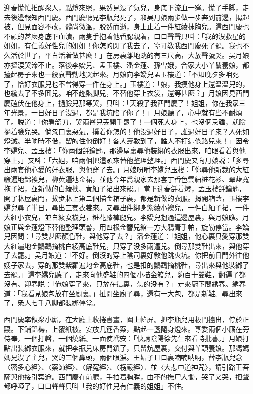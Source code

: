 迎春慌忙推醒衆人，點燈來照，果然見没了氣兒，身底下流血一窪。慌了手脚，走去後邊報知西門慶。西門慶聽見李瓶兒死了，和吴月娘兩步做一步奔到前邊，揭起被，但見面容不改，體尚微溫，脱然而逝，身上止着一件紅綾抹胸兒。這西門慶也不顧的甚麽身底下血漬，兩隻手抱着他香腮親着，口口聲聲只呌：「我的沒救星的姐姐，有仁義好性兒的姐姐！你怎的閃了我去了，寜可敎我西門慶死了罷。我也不久活於世了，平白活着做甚麽！」在房裏離地跳的有三尺高，大放聲號哭。吴月娘亦搵涙哭渧不止。落後李嬌兒、孟玉樓、潘金蓮、孫雪娥，合家大小丫鬟養娘，都擡起房子來也一般哀聲動地哭起來。月娘向李嬌兒孟玉樓道：「不知晚夕多咱死了，恰好衣服兒也不曾得穿一件在身上。」玉樓道：「娘，我摸他身上還溫溫兒的，也纔去了不多囬兒。咱不趂熱脚兒，不替他穿上衣裳，還等甚麽？」月娘因見西門慶磕伏在他身上，撾臉兒那等哭，只呌：「天殺了我西門慶了！姐姐，你在我家三年光景，一日好日子沒過，都是我坑陷了你了！」月娘聽了，心中就有些不耐煩了。説道：「你看韶刀，哭兩聲兒丟開手罷了！一個死人身上，也沒個忌諱，就臉撾着臉兒哭。倘忽口裏惡氣，撲着你怎的！他没過好日子，誰過好日子來？人死如燈滅。半晌時不借，留的住他倒好！各人壽數到了，誰人不打這條路兒來！」因令李嬌兒、孟玉樓：「你兩個㧱鑰匙，那邊屋裏尋他裝綁的衣服出來，咱眼看着與他穿上。」又呌：「六姐，咱兩個把這頭來替他整理整理。」西門慶又向月娘説：「多尋出兩套他心愛的好衣服，與他穿了去。」月娘吩咐李嬌兒玉樓：「你尋他新裁的大紅緞遍地錦襖兒，柳黄遍地金裙，並他今年喬親家去那套丁香色雲紬粧花衫、翠藍寬拖子裙，並新做的白綾襖、黄紬子裙出來罷。」當下迎春㧱着燈，孟玉樓㧱鑰匙，開了牀屋裏門，拔步牀上第二個描金箱子裏，都是新做的衣服。揭開箱蓋，玉樓李嬌兒尋了半日，尋出三套衣裳來。又尋出件綁身紫綾小襖兒，一件白紬子裙，一件大紅小衣兒，並白綾女襪兒，粧花膝褲腿兒。李嬌兒抱過這邊屋裏，與月娘瞧。月娘正與金蓮燈下替他整理頭髻，用四根金簪兒綰一方大鴉青手帕，旋勒停當。李嬌兒因問：「尋雙甚麽顏色鞋，與他穿了去？」潘金蓮道：「姐姐，他心裏只愛穿那雙大紅遍地金鸚鵡摘桃白綾高底鞋兒，只穿了没多兩遭兒。倒尋那雙鞋出來，與他穿了去罷。」吴月娘道：「不好。倒沒的穿上陰司裏好敎他跳火坑。你把前日門外往他嫂子家去，穿的那雙紫羅遍地金高底鞋，也是扣的鸚鵡摘桃鞋，尋出來與他裝綁了去罷。」這李嬌兒聽了，走來向他盛鞋的四個小描金箱兒，約百十雙鞋，翻遍了都沒有。迎春説：「俺娘穿了來，只放在這裏，怎的没有？」走來廚下問綉春。綉春道：「我看見娘包放在坐廚裏。」扯開坐廚子尋，還有一大包，都是新鞋。尋出來了，衆人七手八脚都裝綁停當。

西門慶率領衆小廝，在大廳上收捲書畫，圍上幃屏。把李瓶兒用板門擡出，停於正寢。下鋪錦褥，上覆紙被。安放几筵香案，點起一盞隨身燈來。專委兩個小廝在旁侍奉，一個打磬，一個燒紙。一面使玳安：「快請陰陽徐先生來看時批書。」月娘打點出裝綁衣服來，就把李瓶兒床房門鎖了，只留炕屋裏，交付與丫頭養娘。那馮媽媽見沒了主兒，哭的三個鼻頭，兩個眼淚。王姑子且口裏喃喃呐呐，替李瓶兒念〈密多心經〉、〈薬師經〉、〈解寃經〉、〈楞嚴經〉，並〈大悲中道神咒〉，請引路王菩薩與他接引冥途。西門慶在前廳，手拍着胸膛，由不的撫尸大慟，哭了又哭，把聲都呼啞了，口口聲聲只呌「我的好性兒有仁義的姐姐」不住。


